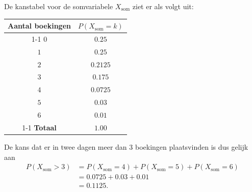 \begin{enumerate}[label=(\alph*)]
{            De kanstabel voor de somvariabele $X_{\text{som}}$ ziet er als volgt uit:
            \begin{center}
                \begin{tabular}{cc}
                    \toprule
                        {\bfseries Aantal boekingen} & {\bfseries $P(X_{\text{som}}=k)$}\\
                    \cmidrule{1-1} \cmidrule{2-2}
                        $0$ & $0.25$ \\
                        $1$ & $0.25$ \\
                        $2$ & $0.2125$ \\
                        $3$ & $0.175$ \\
                        $4$ & $0.0725$ \\
                        $5$ & $0.03$ \\
                        $6$ & $0.01$ \\
                    \cmidrule{1-1} \cmidrule{2-2}
                        {\bfseries Totaal} & $1.00$\\
                    \bottomrule
                \end{tabular}
            \end{center}
            De kans dat er in twee dagen meer dan 3 boekingen plaatsvinden is dus gelijk aan
            \begin{align*}
                P(X_{\text{som}} > 3)   &= P(X_{\text{som}}= 4) + P(X_{\text{som}}= 5) + P(X_{\text{som}}= 6) \\
                                        &= 0.0725 + 0.03 + 0.01 \\
                                        &= 0.1125.
            \end{align*}
        }
\end{enumerate}